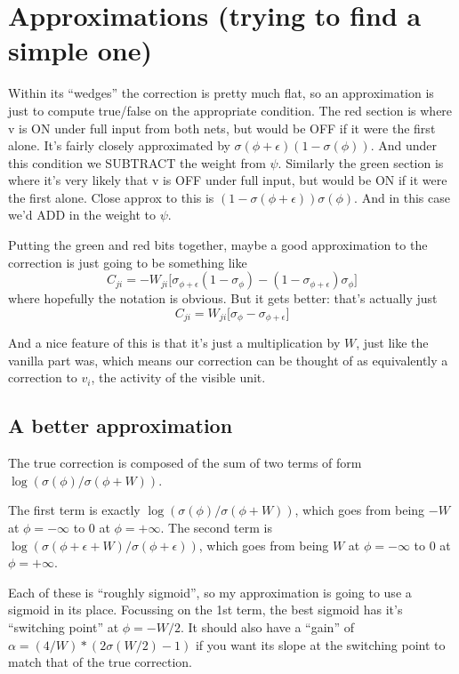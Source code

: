 \documentclass{article}
\begin{document}
    \section{Approximations (trying to find a simple
one)}\label{approximations-trying-to-find-a-simple-one}

Within its ``wedges'' the correction is pretty much flat, so an
approximation is just to compute true/false on the appropriate
condition. The red section is where v is ON under full input from both
nets, but would be OFF if it were the first alone. It's fairly closely
approximated by \(\sigma(\phi+\epsilon) (1-\sigma(\phi))\). And under
this condition we SUBTRACT the weight from \(\psi\). Similarly the green
section is where it's very likely that v is OFF under full input, but
would be ON if it were the first alone. Close approx to this is
\((1-\sigma(\phi+\epsilon)) \sigma(\phi)\). And in this case we'd ADD in
the weight to \(\psi\).

Putting the green and red bits together, maybe a good approximation to
the correction is just going to be something like
\[ C_{ji} =  -W_{ji} \bigg[\sigma_{\phi+\epsilon} (1-\sigma_{\phi})  - (1-\sigma_{\phi+\epsilon}) \sigma_{\phi} \bigg] \]
where hopefully the notation is obvious. But it gets better: that's
actually just
\[ C_{ji} =  W_{ji} \bigg[\sigma_{\phi}- \sigma_{\phi+\epsilon} \bigg]\]

And a nice feature of this is that it's just a multiplication by \(W\),
just like the vanilla part was, which means our correction can be
thought of as equivalently a correction to \(v_i\), the activity of the
visible unit.

    \subsection{A better approximation}\label{a-better-approximation}

The true correction is composed of the sum of two terms of form
\(\log(\sigma(\phi)/\sigma(\phi+W))\).

The first term is exactly \(\log(\sigma(\phi)/\sigma(\phi+W))\), which
goes from being \(-W\) at \(\phi=-\infty\) to \(0\) at \(\phi=+\infty\).
The second term is
\(\log(\sigma(\phi+\epsilon+W)/\sigma(\phi+\epsilon))\), which goes from
being \(W\) at \(\phi=-\infty\) to \(0\) at \(\phi=+\infty\).

Each of these is ``roughly sigmoid'', so my approximation is going to
use a sigmoid in its place. Focussing on the 1st term, the best sigmoid
has it's ``switching point'' at \(\phi = -W/2\). It should also have a
``gain'' of \(\alpha = (4/W)*(2\sigma(W/2)-1)\) if you want its slope at
the switching point to match that of the true correction.
\end{document}
